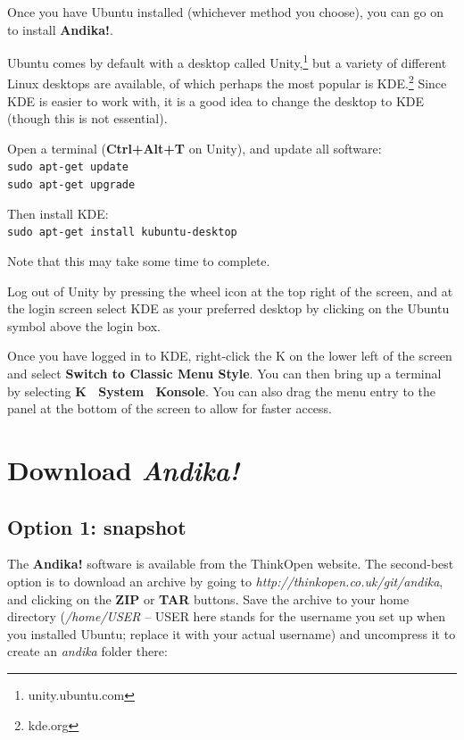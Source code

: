 Once you have Ubuntu installed (whichever method you choose), you can go on to install \textbf{Andika!}.

Ubuntu comes by default with a desktop called Unity,\footnote{unity.ubuntu.com} but a variety of different Linux desktops are available, of which perhaps the most popular is KDE.\footnote{kde.org}  Since KDE is easier to work with, it is a good idea to change the desktop to KDE (though this is not essential).

Open a terminal (\textbf{Ctrl+Alt+T} on Unity), and update all software:\\
\verb|sudo apt-get update|\\
\verb|sudo apt-get upgrade|

Then install KDE:\\
\verb|sudo apt-get install kubuntu-desktop|

Note that this may take some time to complete.

Log out of Unity by pressing the wheel icon at the top right of the screen, and at the login screen select KDE as your preferred desktop by clicking on the Ubuntu symbol above the login box.

Once you have logged in to KDE, right-click the K on the lower left of the screen and select \textbf{Switch to Classic Menu Style}.  You can then bring up a terminal by selecting \textbf{K \textrightarrow\ System \textrightarrow\ Konsole}.  You can also drag the menu entry to the panel at the bottom of the screen to allow for faster access.


\section{Download \textit{Andika!}}
\label{s:download}

\subsection{Option 1: snapshot}
\label{s:snapshot}

The \textbf{Andika!} software is available from the ThinkOpen website.  The second-best option is to download an archive by going to \textit{http://thinkopen.co.uk/git/andika}, and clicking on the \textbf{ZIP} or \textbf{TAR} buttons.  Save the archive to your home directory (\textit{/home/USER} -- USER here stands for the username you set up when you installed Ubuntu; replace it with your actual username) and uncompress it to create an \textit{andika} folder there:


